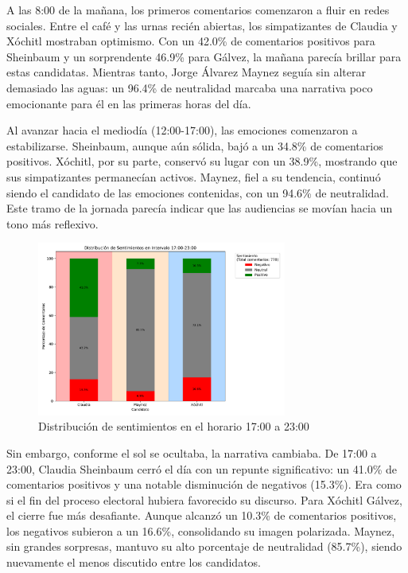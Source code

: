 \documentclass[10pt, a4paper]{article}
\begin{document}
	A las 8:00 de la mañana, los primeros comentarios comenzaron a fluir en redes sociales. Entre el café y las urnas recién abiertas, los simpatizantes de Claudia y Xóchitl mostraban optimismo. Con un 42.0\% de comentarios positivos para Sheinbaum y un sorprendente 46.9\% para Gálvez, la mañana parecía brillar para estas candidatas. Mientras tanto, Jorge Álvarez Maynez seguía sin alterar demasiado las aguas: un 96.4\% de neutralidad marcaba una narrativa poco emocionante para él en las primeras horas del día.
	
	Al avanzar hacia el mediodía (12:00-17:00), las emociones comenzaron a estabilizarse. Sheinbaum, aunque aún sólida, bajó a un 34.8\% de comentarios positivos. Xóchitl, por su parte, conservó su lugar con un 38.9\%, mostrando que sus simpatizantes permanecían activos. Maynez, fiel a su tendencia, continuó siendo el candidato de las emociones contenidas, con un 94.6\% de neutralidad. Este tramo de la jornada parecía indicar que las audiencias se movían hacia un tono más reflexivo.
	
	\begin{figure}[H] %
		\centering
		\includegraphics[width=0.73\textwidth]{sA_intervalo_1723.pdf} %
		\caption{Distribución de sentimientos en el horario 17:00 a 23:00} %
		\label{fig:sA_17a23} %
	\end{figure}
	
	Sin embargo, conforme el sol se ocultaba, la narrativa cambiaba. De 17:00 a 23:00, Claudia Sheinbaum cerró el día con un repunte significativo: un 41.0\% de comentarios positivos y una notable disminución de negativos (15.3\%). Era como si el fin del proceso electoral hubiera favorecido su discurso. Para Xóchitl Gálvez, el cierre fue más desafiante. Aunque alcanzó un 10.3\% de comentarios positivos, los negativos subieron a un 16.6\%, consolidando su imagen polarizada. Maynez, sin grandes sorpresas, mantuvo su alto porcentaje de neutralidad (85.7\%), siendo nuevamente el menos discutido entre los candidatos.
	
\end{document}
